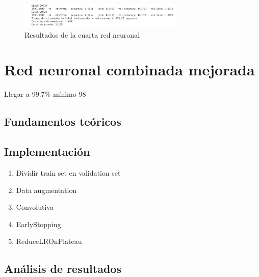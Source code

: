 \begin{figure}[H]
	\centering
	\includegraphics[width=0.7\textwidth]{imgs/results-red4.JPG}
	\caption{Resultados de la cuarta red neuronal}
	\label{fig:results-red4}
\end{figure}



\section{Red neuronal combinada mejorada}

Llegar a 99.7\% mínimo 98

\subsection{Fundamentos teóricos}

\subsection{Implementación}

\begin{enumerate}
	\item Dividir train set en validation set
	\item Data augmentation
	\item Convolutiva
	\item EarlyStopping
	\item ReduceLROnPlateau
\end{enumerate}


\subsection{Análisis de resultados}


